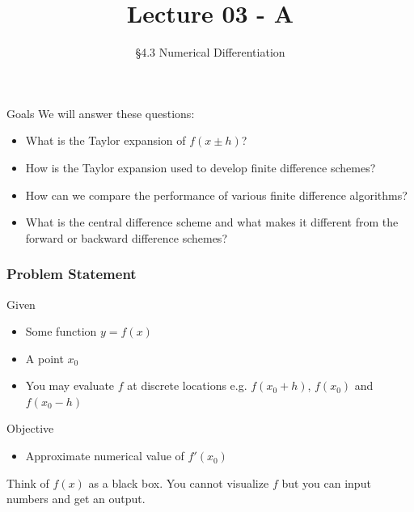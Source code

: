 \documentclass[10pt]{beamer}
\title[Math/CS 375]{Lecture 03 - A}
\subtitle{\S 4.3 Numerical Differentiation}
\begin{document}
\begin{frame}
  \titlepage
\end{frame}

\begin{frame}{Goals}
We will answer these questions:\\[3mm]
\begin{itemize}
    \item What is the Taylor expansion of $f(x\pm h)$?
    \item How is the Taylor expansion used to develop finite difference schemes?
    \item How can we compare the performance of various finite difference algorithms?
    \item What is the central difference scheme and what makes it different from the forward or backward difference schemes? 
\end{itemize}
\end{frame}

\begin{frame}
\frametitle{Problem Statement}
\begin{block}{Given}
  \begin{itemize}
      \item Some function $y=f(x)$
      \item A point $x_0$
      \item You may evaluate $f$ at discrete locations e.g. $f(x_0+h)$, $f(x_0)$ and $f(x_0-h)$
  \end{itemize}
\end{block}

\begin{block}{Objective}
  \begin{itemize}
      \item Approximate numerical value of $f'(x_0)$
  \end{itemize}
\end{block}

\vspace{4mm}
\begin{center}
Think of $f(x)$ as a black box. You cannot visualize $f$ but you can input numbers and get an output. 
\end{center}

\end{frame}
\end{document}
